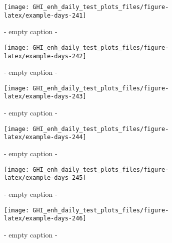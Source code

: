 \documentclass[
  10pt,
  a4paper,oneside]{article}
\begin{document}
\begin{figure}[H]

{\centering \texttt{[image: GHI\_enh\_daily\_test\_plots\_files/figure-latex/example-days-241]} 

}

\caption{ - empty caption - }\label{fig:example-days-241}
\end{figure}

\begin{figure}[H]

{\centering \texttt{[image: GHI\_enh\_daily\_test\_plots\_files/figure-latex/example-days-242]} 

}

\caption{ - empty caption - }\label{fig:example-days-242}
\end{figure}

\begin{figure}[H]

{\centering \texttt{[image: GHI\_enh\_daily\_test\_plots\_files/figure-latex/example-days-243]} 

}

\caption{ - empty caption - }\label{fig:example-days-243}
\end{figure}

\begin{figure}[H]

{\centering \texttt{[image: GHI\_enh\_daily\_test\_plots\_files/figure-latex/example-days-244]} 

}

\caption{ - empty caption - }\label{fig:example-days-244}
\end{figure}

\begin{figure}[H]

{\centering \texttt{[image: GHI\_enh\_daily\_test\_plots\_files/figure-latex/example-days-245]} 

}

\caption{ - empty caption - }\label{fig:example-days-245}
\end{figure}

\begin{figure}[H]

{\centering \texttt{[image: GHI\_enh\_daily\_test\_plots\_files/figure-latex/example-days-246]} 

}

\caption{ - empty caption - }\label{fig:example-days-246}
\end{figure}
\end{document}
